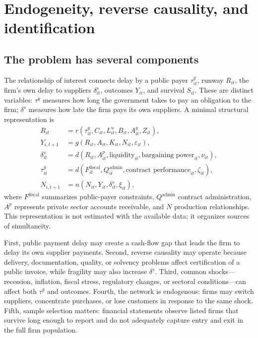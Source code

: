 \documentclass[11pt,a4paper]{article}
\begin{document}
\section{Endogeneity, reverse causality, and identification}
\subsection{The problem has several components}
The relationship of interest connects delay by a public payer $\tau^g_{it}$, runway $R_{it}$, the firm’s own delay to suppliers $\delta^s_{it}$, outcomes $Y_{it}$, and survival $S_{it}$. These are distinct variables: $\tau^g$ measures how long the government takes to pay an obligation to the firm; $\delta^s$ measures how late the firm pays its own suppliers. A minimal structural representation is
\begin{align}
R_{it}&=r(\tau^g_{it},C_{it},L^u_{it},B_{it},A^g_{it},Z_{it}),\\
Y_{i,t+1}&=g(R_{it},A_{it},K_{it},N_{it},\varepsilon_{it}),\\
\delta^s_{it}&=d(R_{it},A^p_{it},\text{liquidity}_{it},\text{bargaining power}_{it},\nu_{it}),\\
\tau^g_{it}&=d(F_{it}^{\mathrm{fiscal}},Q_{it}^{\mathrm{admin}},\text{contract performance}_{it},\zeta_{it}),\\
N_{i,t+1}&=n(N_{it},Y_{it},\delta^s_{it},\xi_{it}),
\end{align}
where $F^{\mathrm{fiscal}}$ summarizes public-payer constraints, $Q^{\mathrm{admin}}$ contract administration, $A^p$ represents private sector accounts receivable, and $N$ production relationships. This representation is not estimated with the available data; it organizes sources of simultaneity.

First, public payment delay may create a cash-flow gap that leads the firm to delay its own supplier payments. Second, reverse causality may operate because delivery, documentation, quality, or solvency problems affect certification of a public invoice, while fragility may also increase $\delta^s$. Third, common shocks—recession, inflation, fiscal stress, regulatory changes, or sectoral conditions—can affect both $\tau^g$ and outcomes. Fourth, the network is endogenous: firms may switch suppliers, concentrate purchases, or lose customers in response to the same shock. Fifth, sample selection matters: financial statements observe listed firms that survive long enough to report and do not adequately capture entry and exit in the full firm population.
\end{document}
